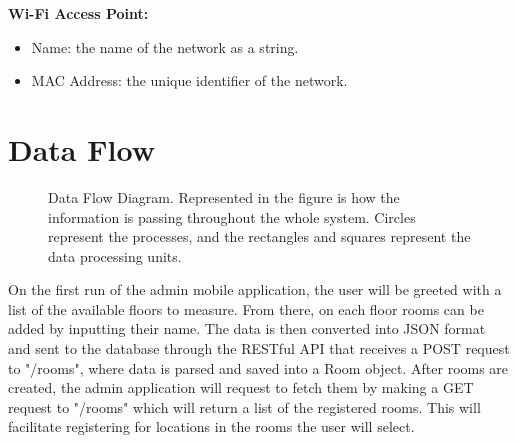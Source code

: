 \noindent\textbf{Wi-Fi Access Point:}
\begin{itemize}
    \item Name: the name of the network as a string.
    \item MAC Address: the unique identifier of the network.
\end{itemize}

\newpage
\section{Data Flow}

\begin{figure}[H]
    \centering
    \centering
    \caption{Data Flow Diagram. Represented in the figure is how the information is passing throughout the whole system. Circles represent the processes, and the rectangles and squares represent the data processing units.}
    \label{fig:data-flow-diagram}
\end{figure}

On the first run of the admin mobile application, the user will be greeted with a list of the available floors to measure. From there, on each floor rooms can be added by inputting their name. The data is then converted into JSON format and sent to the database through the RESTful API that receives a POST request to "/rooms", where data is parsed and saved into a Room object. After rooms are created, the admin application will request to fetch them by making a GET request to "/rooms" which will return a list of the registered rooms. This will facilitate registering for locations in the rooms the user will select.


